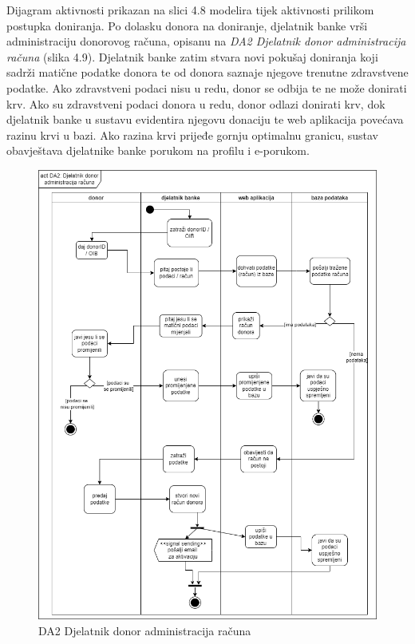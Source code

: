     \par {Dijagram aktivnosti prikazan na slici 4.8 modelira tijek aktivnosti prilikom postupka doniranja.  Po dolasku donora na doniranje, djelatnik banke vrši administraciju donorovog računa, opisanu na \textit{DA2 Djelatnik donor administracija računa} (slika 4.9). Djelatnik banke zatim stvara novi pokušaj doniranja koji sadrži matične podatke donora te od donora saznaje njegove trenutne zdravstvene podatke. Ako zdravstveni podaci nisu u redu, donor se odbija te ne može donirati krv. Ako su zdravstveni podaci donora u redu, donor odlazi donirati krv, dok djelatnik banke u sustavu evidentira njegovu donaciju te web aplikacija povećava razinu krvi u bazi. Ako razina krvi prijeđe gornju optimalnu granicu, sustav obavještava djelatnike banke porukom na profilu i e-porukom.}
    
    \eject
    
    \begin{figure}[H]
        \includegraphics[scale=0.40]{slike/DA2 Djelatnik donor administracija racuna.png}
    	\centering
    	\caption{DA2 Djelatnik donor administracija računa}
    	\label{fig:da2}
    \end{figure}
    
